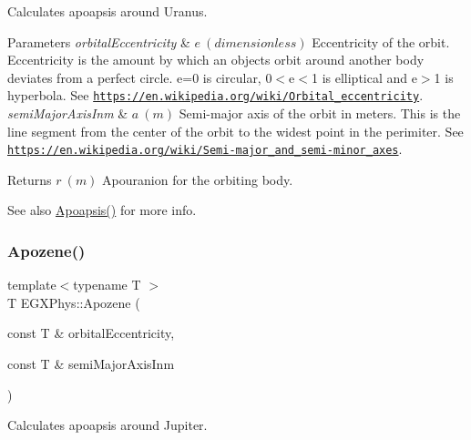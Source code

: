 Calculates apoapsis around Uranus. 


\begin{DoxyParams}{Parameters}
{\em orbital\+Eccentricity} & $ e\ (dimensionless)$ Eccentricity of the orbit. Eccentricity is the amount by which an objects orbit around another body deviates from a perfect circle. e=0 is circular, 0$<$e$<$1 is elliptical and e$>$1 is hyperbola. See \href{https://en.wikipedia.org/wiki/Orbital_eccentricity}{\tt https\+://en.\+wikipedia.\+org/wiki/\+Orbital\+\_\+eccentricity}. \\
\hline
{\em semi\+Major\+Axis\+Inm} & $ a\ (m)$ Semi-\/major axis of the orbit in meters. This is the line segment from the center of the orbit to the widest point in the perimiter. See \href{https://en.wikipedia.org/wiki/Semi-major_and_semi-minor_axes}{\tt https\+://en.\+wikipedia.\+org/wiki/\+Semi-\/major\+\_\+and\+\_\+semi-\/minor\+\_\+axes}. \\
\hline
\end{DoxyParams}
\begin{DoxyReturn}{Returns}
$ r\ (m)$ Apouranion for the orbiting body. 
\end{DoxyReturn}
\begin{DoxySeeAlso}{See also}
\mbox{\hyperlink{group___e_g_x_phys-_apoapsis_gafd08a2d1d64886e7bb9bcb7ff65bc3ea}{Apoapsis()}} for more info. 
\end{DoxySeeAlso}
\mbox{\label{group___e_g_x_phys-_apoapsis_ga2de1f63be8e4e22f219c4e947588a207}} 
\subsubsection{\texorpdfstring{Apozene()}{Apozene()}}
{\footnotesize\ttfamily template$<$typename T $>$ \\
T E\+G\+X\+Phys\+::\+Apozene (\begin{DoxyParamCaption}\item[{const T \&}]{orbital\+Eccentricity,  }\item[{const T \&}]{semi\+Major\+Axis\+Inm }\end{DoxyParamCaption})}



Calculates apoapsis around Jupiter. 


